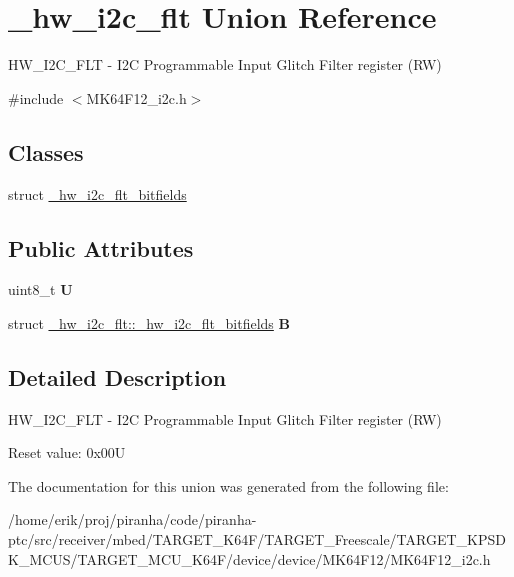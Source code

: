 \hypertarget{union__hw__i2c__flt}{}\section{\+\_\+hw\+\_\+i2c\+\_\+flt Union Reference}
\label{union__hw__i2c__flt}


H\+W\+\_\+\+I2\+C\+\_\+\+F\+LT -\/ I2C Programmable Input Glitch Filter register (RW)  




{\ttfamily \#include $<$M\+K64\+F12\+\_\+i2c.\+h$>$}

\subsection*{Classes}
\begin{DoxyCompactItemize}
\item 
struct \hyperlink{struct__hw__i2c__flt_1_1__hw__i2c__flt__bitfields}{\+\_\+hw\+\_\+i2c\+\_\+flt\+\_\+bitfields}
\end{DoxyCompactItemize}
\subsection*{Public Attributes}
\begin{DoxyCompactItemize}
\item 
uint8\+\_\+t {\bfseries U}\hypertarget{union__hw__i2c__flt_ab8b7e0b7a7cc5734403ade88e9467536}{}\label{union__hw__i2c__flt_ab8b7e0b7a7cc5734403ade88e9467536}

\item 
struct \hyperlink{struct__hw__i2c__flt_1_1__hw__i2c__flt__bitfields}{\+\_\+hw\+\_\+i2c\+\_\+flt\+::\+\_\+hw\+\_\+i2c\+\_\+flt\+\_\+bitfields} {\bfseries B}\hypertarget{union__hw__i2c__flt_aa8e3772a3f164956a8f56b483ea140bb}{}\label{union__hw__i2c__flt_aa8e3772a3f164956a8f56b483ea140bb}

\end{DoxyCompactItemize}


\subsection{Detailed Description}
H\+W\+\_\+\+I2\+C\+\_\+\+F\+LT -\/ I2C Programmable Input Glitch Filter register (RW) 

Reset value\+: 0x00U 

The documentation for this union was generated from the following file\+:\begin{DoxyCompactItemize}
\item 
/home/erik/proj/piranha/code/piranha-\/ptc/src/receiver/mbed/\+T\+A\+R\+G\+E\+T\+\_\+\+K64\+F/\+T\+A\+R\+G\+E\+T\+\_\+\+Freescale/\+T\+A\+R\+G\+E\+T\+\_\+\+K\+P\+S\+D\+K\+\_\+\+M\+C\+U\+S/\+T\+A\+R\+G\+E\+T\+\_\+\+M\+C\+U\+\_\+\+K64\+F/device/device/\+M\+K64\+F12/M\+K64\+F12\+\_\+i2c.\+h\end{DoxyCompactItemize}
